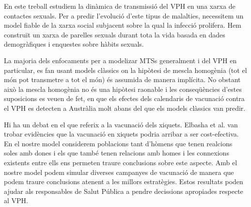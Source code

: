 En este treball estudiem la din\`amica de transmissi\'o del VPH en una xarxa de contactes sexuals. Per a predir l'evoluci\'o d'este tipus de malalties, necessitem un model fiable de la xarxa social subjacent sobre la qual la infecci\'o prolifera. Hem construït un xarxa de parelles sexuals durant tota la vida basada en dades demogr\`afiques i enquestes sobre h\`abits sexuals.

La majoria dels enfocaments per a modelizar MTSs generalment i del VPH en particular, es fan usant models cl\`assics on la hip\`otesi de mescla homog\`enia (tot el m\'on pot transmetre a tot el m\'on) \'es assumida de manera impl\'icita. No obstant aix\`o la mescla homog\`enia no \'es una hip\`otesi raonable i les conseq\"u\`encies d'estes suposicions es veuen de fet, en que els efectes dels calendaris de vacunaci\'o contra el VPH es detecten a Austr\`alia molt abans del que els models cl\`assics van predir.

Hi ha un debat en el que referix a la vacunaci\'o dels xiquets. Elbasha et al. van trobar evid\`encies que la vacunaci\'o en xiquets podria arribar a ser cost-efectiva. En el nostre model considerem poblacions tant d'h\`omens que tenen realcions soles amb dones i els que tamb\'e tenen relacions amb homes i les connexions existents entre ells ens permeten traure conclusions sobre este aspecte. Amb el nostre model podem simular diverses campanyes de vacunaci\'o de manera que podem traure conclusions atenent a les millors estrat\`egies. Estos resultats poden ajudar als responsables de Salut P\'ublica a pendre decissions apropiades respecte al VPH.
